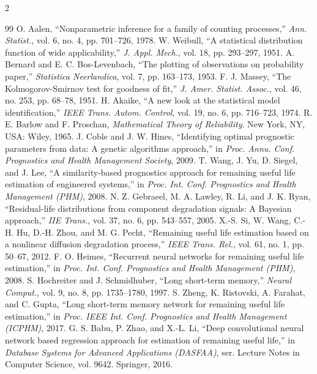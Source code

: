 \begin{multicols}{2}
\begin{thebibliography}{99}
 O. Aalen, ``Nonparametric inference for a family of counting processes,'' \emph{Ann. Statist.}, vol. 6, no. 4, pp. 701–726, 1978.
 W. Weibull, ``A statistical distribution function of wide applicability,'' \emph{J. Appl. Mech.}, vol. 18, pp. 293–297, 1951.
 A. Bernard and E. C. Bos-Levenbach, ``The plotting of observations on probability paper,'' \emph{Statistica Neerlandica}, vol. 7, pp. 163–173, 1953.
 F. J. Massey, ``The Kolmogorov-Smirnov test for goodness of fit,'' \emph{J. Amer. Statist. Assoc.}, vol. 46, no. 253, pp. 68–78, 1951.
 H. Akaike, ``A new look at the statistical model identification,'' \emph{IEEE Trans. Autom. Control}, vol. 19, no. 6, pp. 716–723, 1974.
 R. E. Barlow and F. Proschan, \emph{Mathematical Theory of Reliability}. New York, NY, USA: Wiley, 1965.
 J. Coble and J. W. Hines, ``Identifying optimal prognostic parameters from data: A genetic algorithms approach,'' in \emph{Proc. Annu. Conf. Prognostics and Health Management Society}, 2009.
 T. Wang, J. Yu, D. Siegel, and J. Lee, ``A similarity-based prognostics approach for remaining useful life estimation of engineered systems,'' in \emph{Proc. Int. Conf. Prognostics and Health Management (PHM)}, 2008.
 N. Z. Gebraeel, M. A. Lawley, R. Li, and J. K. Ryan, ``Residual-life distributions from component degradation signals: A Bayesian approach,'' \emph{IIE Trans.}, vol. 37, no. 6, pp. 543–557, 2005.
 X.-S. Si, W. Wang, C.-H. Hu, D.-H. Zhou, and M. G. Pecht, ``Remaining useful life estimation based on a nonlinear diffusion degradation process,'' \emph{IEEE Trans. Rel.}, vol. 61, no. 1, pp. 50–67, 2012.
 F. O. Heimes, ``Recurrent neural networks for remaining useful life estimation,'' in \emph{Proc. Int. Conf. Prognostics and Health Management (PHM)}, 2008.
 S. Hochreiter and J. Schmidhuber, ``Long short-term memory,'' \emph{Neural Comput.}, vol. 9, no. 8, pp. 1735–1780, 1997.
 S. Zheng, K. Ristovski, A. Farahat, and C. Gupta, ``Long short-term memory network for remaining useful life estimation,'' in \emph{Proc. IEEE Int. Conf. Prognostics and Health Management (ICPHM)}, 2017.
 G. S. Babu, P. Zhao, and X.-L. Li, ``Deep convolutional neural network based regression approach for estimation of remaining useful life,'' in \emph{Database Systems for Advanced Applications (DASFAA)}, ser. Lecture Notes in Computer Science, vol. 9642. Springer, 2016.

\end{thebibliography}
\end{multicols}
